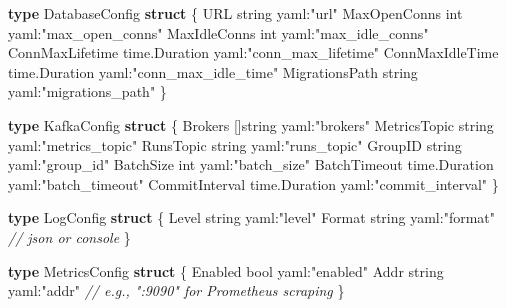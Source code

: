 \documentclass[
]{article}
\newenvironment{Shaded}{}{}
\newcommand{\CommentTok}[1]{\textcolor[rgb]{0.38,0.63,0.69}{\textit{#1}}}
\newcommand{\DataTypeTok}[1]{\textcolor[rgb]{0.56,0.13,0.00}{#1}}
\newcommand{\KeywordTok}[1]{\textcolor[rgb]{0.00,0.44,0.13}{\textbf{#1}}}
\newcommand{\NormalTok}[1]{#1}
\newcommand{\OperatorTok}[1]{\textcolor[rgb]{0.40,0.40,0.40}{#1}}
\newcommand{\StringTok}[1]{\textcolor[rgb]{0.25,0.44,0.63}{#1}}
\begin{document}
\begin{Shaded}
\begin{Highlighting}[]
\KeywordTok{type}\NormalTok{ DatabaseConfig }\KeywordTok{struct} \OperatorTok{\{}
\NormalTok{    URL             }\DataTypeTok{string}        \StringTok{\textasciigrave{}yaml:"url"\textasciigrave{}}
\NormalTok{    MaxOpenConns    }\DataTypeTok{int}           \StringTok{\textasciigrave{}yaml:"max\_open\_conns"\textasciigrave{}}
\NormalTok{    MaxIdleConns    }\DataTypeTok{int}           \StringTok{\textasciigrave{}yaml:"max\_idle\_conns"\textasciigrave{}}
\NormalTok{    ConnMaxLifetime time}\OperatorTok{.}\NormalTok{Duration }\StringTok{\textasciigrave{}yaml:"conn\_max\_lifetime"\textasciigrave{}}
\NormalTok{    ConnMaxIdleTime time}\OperatorTok{.}\NormalTok{Duration }\StringTok{\textasciigrave{}yaml:"conn\_max\_idle\_time"\textasciigrave{}}
\NormalTok{    MigrationsPath  }\DataTypeTok{string}        \StringTok{\textasciigrave{}yaml:"migrations\_path"\textasciigrave{}}
\OperatorTok{\}}

\KeywordTok{type}\NormalTok{ KafkaConfig }\KeywordTok{struct} \OperatorTok{\{}
\NormalTok{    Brokers        }\OperatorTok{[]}\DataTypeTok{string}      \StringTok{\textasciigrave{}yaml:"brokers"\textasciigrave{}}
\NormalTok{    MetricsTopic   }\DataTypeTok{string}        \StringTok{\textasciigrave{}yaml:"metrics\_topic"\textasciigrave{}}
\NormalTok{    RunsTopic      }\DataTypeTok{string}        \StringTok{\textasciigrave{}yaml:"runs\_topic"\textasciigrave{}}
\NormalTok{    GroupID        }\DataTypeTok{string}        \StringTok{\textasciigrave{}yaml:"group\_id"\textasciigrave{}}
\NormalTok{    BatchSize      }\DataTypeTok{int}           \StringTok{\textasciigrave{}yaml:"batch\_size"\textasciigrave{}}
\NormalTok{    BatchTimeout   time}\OperatorTok{.}\NormalTok{Duration }\StringTok{\textasciigrave{}yaml:"batch\_timeout"\textasciigrave{}}
\NormalTok{    CommitInterval time}\OperatorTok{.}\NormalTok{Duration }\StringTok{\textasciigrave{}yaml:"commit\_interval"\textasciigrave{}}
\OperatorTok{\}}

\KeywordTok{type}\NormalTok{ LogConfig }\KeywordTok{struct} \OperatorTok{\{}
\NormalTok{    Level  }\DataTypeTok{string} \StringTok{\textasciigrave{}yaml:"level"\textasciigrave{}}
\NormalTok{    Format }\DataTypeTok{string} \StringTok{\textasciigrave{}yaml:"format"\textasciigrave{}} \CommentTok{// json or console}
\OperatorTok{\}}

\KeywordTok{type}\NormalTok{ MetricsConfig }\KeywordTok{struct} \OperatorTok{\{}
\NormalTok{    Enabled }\DataTypeTok{bool}   \StringTok{\textasciigrave{}yaml:"enabled"\textasciigrave{}}
\NormalTok{    Addr    }\DataTypeTok{string} \StringTok{\textasciigrave{}yaml:"addr"\textasciigrave{}}  \CommentTok{// e.g., ":9090" for Prometheus scraping}
\OperatorTok{\}}
\end{Highlighting}
\end{Shaded}
\end{document}
